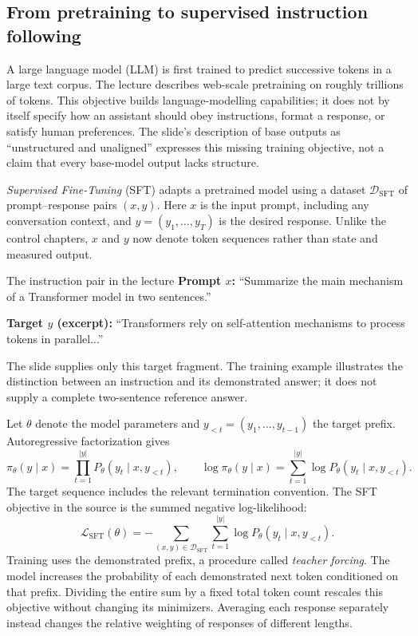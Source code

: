 \documentclass[11pt,a4paper]{article}
\numberwithin{equation}{section}
\numberwithin{figure}{section}
\numberwithin{table}{section}
\begin{document}
\subsection{From pretraining to supervised instruction following}\label{sec:sft}
A large language model (LLM) is first trained to predict successive tokens in a large text corpus. The lecture describes web-scale pretraining on roughly trillions of tokens. This objective builds language-modelling capabilities; it does not by itself specify how an assistant should obey instructions, format a response, or satisfy human preferences. The slide's description of base outputs as ``unstructured and unaligned'' expresses this missing training objective, not a claim that every base-model output lacks structure.

\emph{Supervised Fine-Tuning} (SFT) adapts a pretrained model using a dataset $\mathcal D_{\mathrm{SFT}}$ of prompt--response pairs $(x,y)$. Here $x$ is the input prompt, including any conversation context, and $y=(y_1,\ldots,y_T)$ is the desired response. Unlike the control chapters, $x$ and $y$ now denote token sequences rather than state and measured output.

\begin{concept}{The instruction pair in the lecture}
\textbf{Prompt $x$:} ``Summarize the main mechanism of a Transformer model in two sentences.''

\textbf{Target $y$ (excerpt):} ``Transformers rely on self-attention mechanisms to process tokens in parallel...''

The slide supplies only this target fragment. The training example illustrates the distinction between an instruction and its demonstrated answer; it does not supply a complete two-sentence reference answer.
\end{concept}
Let $\theta$ denote the model parameters and $y_{<t}=(y_1,\ldots,y_{t-1})$ the target prefix. Autoregressive factorization gives
\begin{equation}\label{eq:sequenceprob}
\pi_\theta(y\mid x)=\prod_{t=1}^{|y|}P_\theta(y_t\mid x,y_{<t}),
\qquad
\log\pi_\theta(y\mid x)=\sum_{t=1}^{|y|}\log P_\theta(y_t\mid x,y_{<t}).
\end{equation}
The target sequence includes the relevant termination convention. The SFT objective in the source is the summed negative log-likelihood:
\begin{equation}\label{eq:sftloss}
\mathcal L_{\mathrm{SFT}}(\theta)
=-\sum_{(x,y)\in\mathcal D_{\mathrm{SFT}}}\sum_{t=1}^{|y|}
\log P_\theta(y_t\mid x,y_{<t}).
\end{equation}
Training uses the demonstrated prefix, a procedure called \emph{teacher forcing}. The model increases the probability of each demonstrated next token conditioned on that prefix. Dividing the entire sum by a fixed total token count rescales this objective without changing its minimizers. Averaging each response separately instead changes the relative weighting of responses of different lengths.
\end{document}

